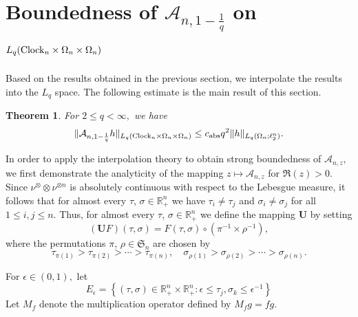 \documentclass{amsart}
\numberwithin{equation}{section}
\newtheorem{thm}{Theorem}[section]
\theoremstyle{definition}
\theoremstyle{remark}
\newcommand{\1}{\mathbf 1}
\begin{document}
\section{Boundedness of $\mathcal{A}_{n,1-\frac1q}$ on $L_{q}({\rm Clock}_{n}\times\Omega_{n}\times \Omega_{n})$}\label{sec:regularization}

Based on the results obtained in the previous section, we interpolate the results into the $L_q$ space. The following estimate is the main result of this section.
\begin{thm}\label{key theorem} For $2\leq q<\infty,$ we have
$$\|\mathcal{A}_{n,1-\frac1q}h\|_{L_q({\rm Clock}_n\times\Omega_n\times\Omega_n)}
 \leq c_{{\rm abs}}q^2\|h\|_{L_q(\Omega_n;\ell_2^n)}.$$
\end{thm}


In order to apply the interpolation theory to obtain strong boundedness of $\mathcal{A}_{n,z},$ we first demonstrate the analyticity of the mapping $z\mapsto \mathcal{A}_{n,z}$ for $\Re(z)>0.$ Since $\nu^{\otimes}\otimes \nu^{\otimes n}$ is absolutely continuous with respect to the Lebesgue measure, it follows that for almost every $\tau$, $\sigma\in \mathbb{R}^{n}_{+}$ we have $\tau_{i}\neq \tau_{j}$ and $\sigma_{i}\neq \sigma_{j}$ for all $1\leq i,j\leq n.$ Thus, for almost every $\tau$, $\sigma\in \mathbb{R}^{n}_{+}$ we define the mapping $\mathbf{U}$ by setting
$$
(\mathbf{U}F)(\tau,\sigma)=F(\tau,\sigma)\circ(\pi^{-1}\times\rho^{-1}),
$$
where the permutations $\pi$, $\rho\in \mathfrak{S}_{n}$ are chosen by
\begin{equation}\label{permutation law}
\tau_{\pi(1)}>\tau_{\pi(2)}>\cdots >\tau_{\pi(n)},\quad \sigma_{\rho(1)}>\sigma_{\rho(2)}>\cdots>\sigma_{\rho(n)}.
\end{equation}

\noindent For $\epsilon\in(0,1),$ let
\begin{equation*}
 E_{\epsilon}=\left\{(\tau,\sigma)\in \mathbb{R}^{n}_{+}\times \mathbb{R}^{n}_{+}: \epsilon\leq\tau_j,\sigma_k\leq\epsilon^{-1}\right\}
\end{equation*}
Let $M_f$ denote the multiplication operator defined by $M_fg=fg.$
\end{document}
